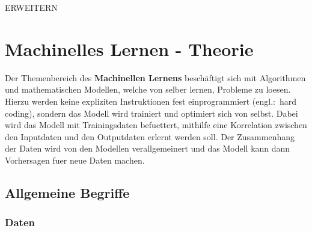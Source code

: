 \documentclass[../main]{subfiles}
\begin{document}
ERWEITERN


\pagebreak
\section{Machinelles Lernen - Theorie}

Der Themenbereich des \textbf{Machinellen Lernens} beschäftigt sich mit Algorithmen und mathematischen Modellen, welche von selber lernen, Probleme zu loesen.
Hierzu werden keine expliziten Instruktionen fest einprogrammiert (engl.:\ hard coding), sondern das Modell wird trainiert und optimiert sich von selbst.
Dabei wird das Modell mit Trainingsdaten befuettert, mithilfe eine Korrelation zwischen den Inputdaten und den Outputdaten erlernt werden soll.
Der Zusammenhang der Daten wird von den Modellen verallgemeinert und das Modell kann dann Vorhersagen fuer neue Daten machen.

\subsection{Allgemeine Begriffe}

\subsubsection{Daten}
\end{document}

